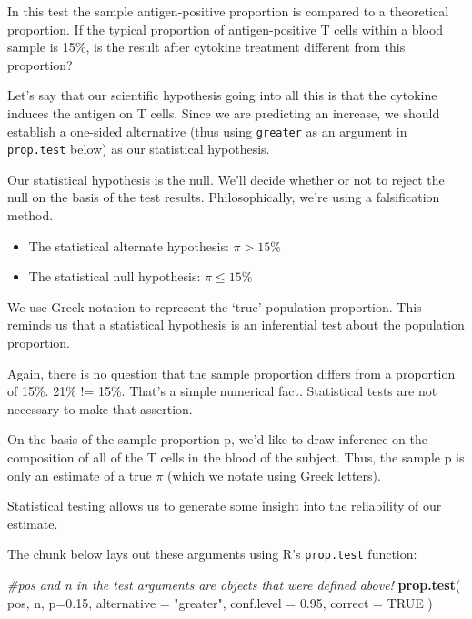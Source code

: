 \documentclass[]{book}
\newenvironment{Shaded}{\begin{snugshade}}{\end{snugshade}}
\newcommand{\CommentTok}[1]{\textcolor[rgb]{0.56,0.35,0.01}{\textit{#1}}}
\newcommand{\DataTypeTok}[1]{\textcolor[rgb]{0.13,0.29,0.53}{#1}}
\newcommand{\FloatTok}[1]{\textcolor[rgb]{0.00,0.00,0.81}{#1}}
\newcommand{\KeywordTok}[1]{\textcolor[rgb]{0.13,0.29,0.53}{\textbf{#1}}}
\newcommand{\NormalTok}[1]{#1}
\newcommand{\OtherTok}[1]{\textcolor[rgb]{0.56,0.35,0.01}{#1}}
\newcommand{\StringTok}[1]{\textcolor[rgb]{0.31,0.60,0.02}{#1}}
\begin{document}
In this test the sample antigen-positive proportion is compared to a theoretical proportion. If the typical proportion of antigen-positive T cells within a blood sample is 15\%, is the result after cytokine treatment different from this proportion?

Let's say that our scientific hypothesis going into all this is that the cytokine induces the antigen on T cells. Since we are predicting an increase, we should establish a one-sided alternative (thus using \texttt{greater} as an argument in \texttt{prop.test} below) as our statistical hypothesis.

Our statistical hypothesis is the null. We'll decide whether or not to reject the null on the basis of the test results. Philosophically, we're using a falsification method.

\begin{itemize}
\item
  The statistical alternate hypothesis: \(\pi>15\%\)
\item
  The statistical null hypothesis: \(\pi\le15\%\)
\end{itemize}

We use Greek notation to represent the `true' population proportion. This reminds us that a statistical hypothesis is an inferential test about the population proportion.

Again, there is no question that the sample proportion differs from a proportion of 15\%. 21\% != 15\%. That's a simple numerical fact. Statistical tests are not necessary to make that assertion.

On the basis of the sample proportion p, we'd like to draw inference on the composition of all of the T cells in the blood of the subject. Thus, the sample p is only an estimate of a true \(\pi\) (which we notate using Greek letters).

Statistical testing allows us to generate some insight into the reliability of our estimate.

The chunk below lays out these arguments using R's \texttt{prop.test} function:

\begin{Shaded}
\begin{Highlighting}[]
\CommentTok{#pos and n in the test arguments are objects that were defined above!}
\KeywordTok{prop.test}\NormalTok{(}
\NormalTok{  pos, n, }\DataTypeTok{p=}\FloatTok{0.15}\NormalTok{, }
  \DataTypeTok{alternative =} \StringTok{"greater"}\NormalTok{, }
  \DataTypeTok{conf.level =} \FloatTok{0.95}\NormalTok{, }
  \DataTypeTok{correct =} \OtherTok{TRUE}
\NormalTok{  )}
\end{Highlighting}
\end{Shaded}
\end{document}

